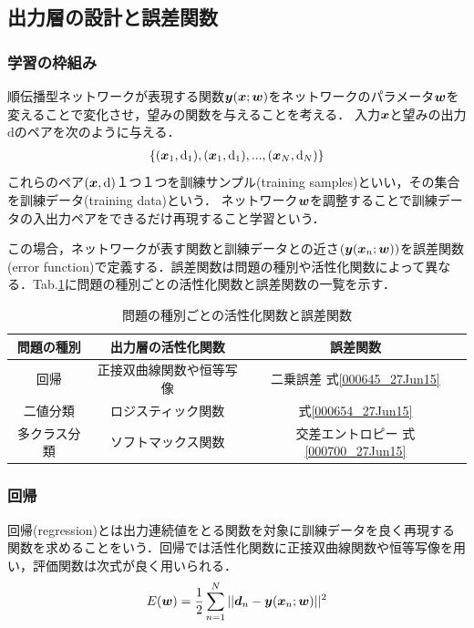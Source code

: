 \documentclass[a4paper,10pt]{jsarticle}
\def\vec#1{\mbox{\boldmath$#1$}}
\begin{document}
\subsection{出力層の設計と誤差関数}
\subsubsection{学習の枠組み}
順伝播型ネットワークが表現する関数$\vec{y}(\vec{x};\vec{w})$をネットワークのパラメータ$\vec{w}$を変えることで変化させ，望みの関数を与えることを考える．
入力$\vec{x}$と望みの出力$\mathrm{d}$のペアを次のように与える．
\begin{eqnarray}
 \{(\vec{x}_{1},\mathrm{d}_{1}),(\vec{x}_{1},\mathrm{d}_{1}),...,(\vec{x}_{N},\mathrm{d}_{N})\}
\end{eqnarray}
これらのペア$(\vec{x},\mathrm{d})$１つ１つを訓練サンプル(training samples)といい，その集合を訓練データ(training data)という．
ネットワーク$\vec{w}$を調整することで訓練データの入出力ペアをできるだけ再現すること学習という．

この場合，ネットワークが表す関数と訓練データとの近さ$(\vec{y}(\vec{x}_{n};\vec{w}))$を誤差関数(error function)で定義する．誤差関数は問題の種別や活性化関数によって異なる．Tab.\ref{000718_27Jun15}に問題の種別ごとの活性化関数と誤差関数の一覧を示す．

\begin{table}[htb]
\centering
\caption{問題の種別ごとの活性化関数と誤差関数}
\label{000718_27Jun15}
\begin{tabular}[bt]{|c|c|c|}\hline
 問題の種別& 出力層の活性化関数&誤差関数 \\ \hline \hline
 回帰&正接双曲線関数や恒等写像 & 二乗誤差 式\eqref{000645_27Jun15}\\
 二値分類& ロジスティック関数& 式\eqref{000654_27Jun15}\\
 多クラス分類& ソフトマックス関数& 交差エントロピー 式\eqref{000700_27Jun15}\\ \hline
\end{tabular}
\end{table}

\subsubsection{回帰}
回帰(regression)とは出力連続値をとる関数を対象に訓練データを良く再現する関数を求めることをいう．回帰では活性化関数に正接双曲線関数や恒等写像を用い，評価関数は次式が良く用いられる．
\begin{eqnarray}
 E(\vec{w}) = \displaystyle{\frac{1}{2}}\sum^{N}_{n=1}||\vec{d}_{n}-\vec{y}(\vec{x}_{n};\vec{w})||^{2}\label{000645_27Jun15}
\end{eqnarray}
\end{document}
